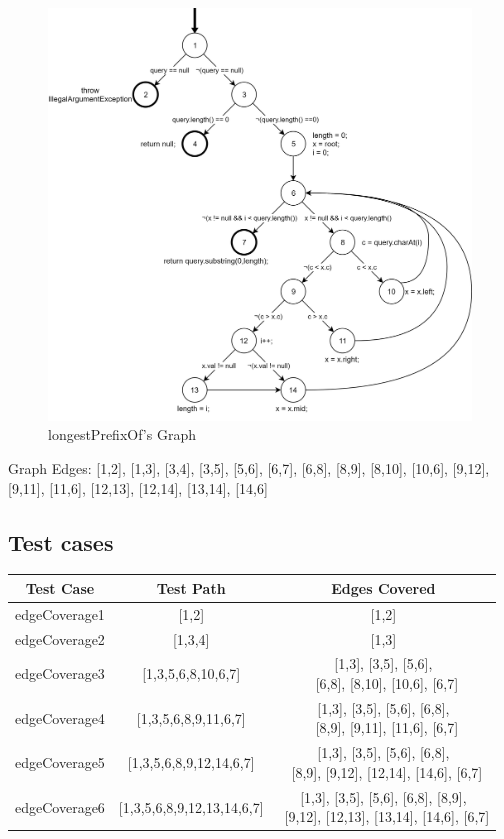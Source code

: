 \documentclass[12pt]{article}
\begin{document}
\begin{figure}[!htbp]
  	\centering
  	\includegraphics[scale=0.15]{longestPrefixOfGraph.png}
  	\caption{longestPrefixOf's Graph}
\end{figure}

Graph Edges: [1,2], [1,3], [3,4], [3,5], [5,6], [6,7], [6,8], [8,9], [8,10], [10,6], [9,12], [9,11], [11,6], [12,13], [12,14], [13,14], [14,6]

\subsection{Test cases}
\begin{table}[!htbp]
\centering
\begin{tabular}{| c | c | c |} 
 \hline
 Test Case & Test Path & Edges Covered\\ \hline
 edgeCoverage1 & [1,2] & [1,2] \\ \hline
 edgeCoverage2 & [1,3,4] & [1,3] \\ \hline
 edgeCoverage3 & [1,3,5,6,8,10,6,7] & \makecell{[1,3], [3,5], [5,6], \\\ [6,8], [8,10], [10,6], [6,7]} \\ \hline
 edgeCoverage4 & [1,3,5,6,8,9,11,6,7] & \makecell{[1,3], [3,5], [5,6], [6,8],\\\ [8,9], [9,11], [11,6], [6,7]} \\ \hline
 edgeCoverage5 & [1,3,5,6,8,9,12,14,6,7] & \makecell{[1,3], [3,5], [5,6], [6,8],\\\ [8,9], [9,12], [12,14], [14,6], [6,7]} \\ \hline
 edgeCoverage6 & [1,3,5,6,8,9,12,13,14,6,7] & \makecell{[1,3], [3,5], [5,6], [6,8], [8,9],\\\ [9,12], [12,13], [13,14], [14,6], [6,7]} \\ \hline
\end{tabular}
\end{table}
\end{document}
